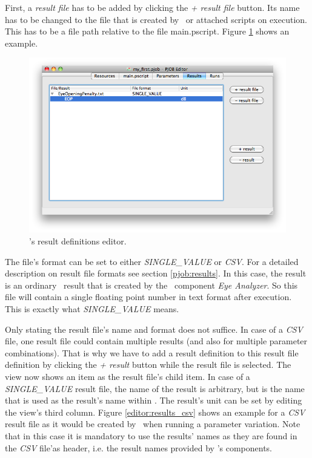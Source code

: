 First, a \textit{result file} has to be added by clicking the \textit{+ result file} button.
Its name has to be changed to the file that is created by \PHO\ or attached scripts on execution.
This has to be a file path relative to the file main.pscript.
Figure \ref{editor:results} shows an example.

\begin{figure}[h!]
\includegraphics[width=\textwidth]{Screenshots/PJobEditor/results.png}
\caption{\pjobeditor's result definitions editor.}
\label{editor:results}
\end{figure}

The file's format can be set to either \textit{SINGLE\_VALUE} or \textit{CSV}.
For a detailed description on result file formats see section \ref{pjob:results}.
In this case, the result is an ordinary \PHO\ result that is created by the \PHO\ component \textit{Eye Analyzer}.
So this file will contain a single floating point number in text format after execution.
This is exactly what \textit{SINGLE\_VALUE} means.

Only stating the result file's name and format does not suffice.
In case of a \textit{CSV} file, one result file could contain multiple results (and also for multiple parameter combinations).
That is why we have to add a result definition to this result file definition
by clicking the \textit{+ result} button while the result file is selected.
The view now shows an item as the result file's child item.
In case of a \textit{SINGLE\_VALUE} result file,
the name of the result is arbitrary,
but is the name that is used as the result's name within \PQUEUE.
The result's unit can be set by editing the view's third column.
Figure \ref{editor:results_csv} shows an example for a \textit{CSV} result file
as it would be created by \PHO\ when running a parameter variation.
Note that in this case it is mandatory to use the results' names as they are
found in the \textit{CSV} file'as header, i.e. the result names provided by \PHO's components.

